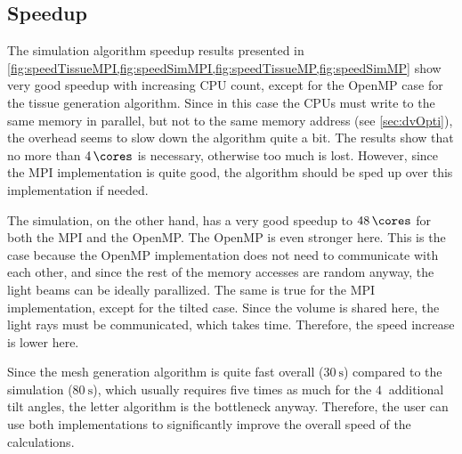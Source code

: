 \subsection{Speedup}
%
The simulation algorithm speedup results presented in \cref{fig:speedTissueMPI,fig:speedSimMPI,fig:speedTissueMP,fig:speedSimMP} show very good speedup with increasing \ac{CPU} count, except for the \ac{OpenMP} case for the tissue generation algorithm.
Since in this case the \acsp{CPU} must write to the same memory in parallel, but not to the same memory address (see \cref{sec:dvOpti}), the overhead seems to slow down the algorithm quite a bit.
The results show that no more than $\SI{4}{\cores}$ is necessary, otherwise too much \dummy{} is lost.
However, since the \ac{MPI} implementation is quite good, the algorithm should be sped up over this implementation if needed.
\par
%
The simulation, on the other hand, has a very good speedup to $\SI{48}{\cores}$ for both the \ac{MPI} and the \ac{OpenMP}.
The \ac{OpenMP} is even stronger here.
This is the case because the \ac{OpenMP} implementation does not need to communicate with each other, and since the rest of the memory accesses are random anyway, the light beams can be ideally parallized.
The same is true for the \ac{MPI} implementation, except for the tilted case.
Since the volume is shared here, the light rays must be communicated, which takes time.
Therefore, the speed increase is lower here.
\par
%
Since the mesh generation algorithm is quite fast overall ($\SI{30}{\second}$) compared to the simulation ($\SI{80}{\second}$), which usually requires five times as much for the $\SI{4}{}$ additional tilt angles, the letter algorithm is the bottleneck anyway.
Therefore, the user can use both implementations to significantly improve the overall speed of the calculations.
